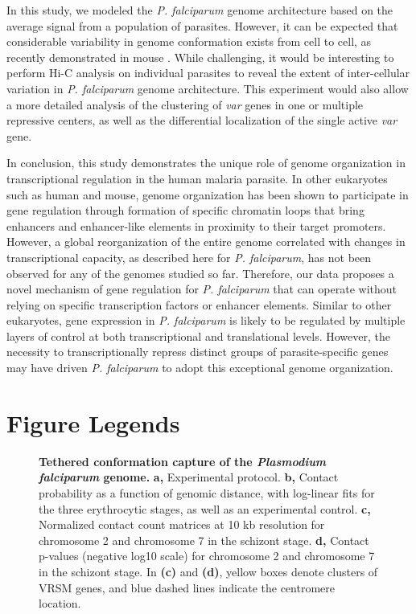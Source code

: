 In this study, we modeled the {\em P. falciparum} genome architecture based on
the average signal from a population of parasites. However, it can be expected
that considerable variability in genome conformation exists from cell to cell,
as recently demonstrated in mouse \citep{nagano:single-cell}. While
challenging, it would be interesting to perform Hi-C analysis on individual
parasites to reveal the extent of inter-cellular variation in {\em P.
falciparum} genome architecture. This experiment would also allow a more
detailed analysis of the clustering of {\em var} genes in one or multiple
repressive centers, as well as the differential localization of the single
active {\em var} gene.

In conclusion, this study demonstrates the unique role of genome organization
in transcriptional regulation in the human malaria parasite. In other
eukaryotes such as human and mouse, genome organization has been shown to
participate in gene regulation through formation of specific chromatin loops
that bring enhancers and enhancer-like elements in proximity to their target
promoters. However, a global reorganization of the entire genome correlated
with changes in transcriptional capacity, as described here for {\em P.
falciparum}, has not been observed for any of the genomes studied so far.
Therefore, our data proposes a novel mechanism of gene regulation for {\em P.
falciparum} that can operate without relying on specific transcription factors
or enhancer elements. Similar to other eukaryotes, gene expression in {\em P.
falciparum} is likely to be regulated by multiple layers of control at both
transcriptional and translational levels. However, the necessity to
transcriptionally repress distinct groups of parasite-specific genes may have
driven {\em P. falciparum} to adopt this exceptional genome organization.

\section*{Figure Legends}

\begin{figure}[h]
\centering
\caption{{\bf Tethered conformation capture of the {\em Plasmodium falciparum}
genome.}
\textbf{a,} Experimental protocol. \textbf{b,} Contact probability as a
function of genomic distance, with log-linear fits for the three erythrocytic
stages, as well as an experimental control. \textbf{c,} Normalized contact
count matrices at 10 kb resolution for chromosome 2 and chromosome 7 in the
schizont stage. \textbf{d,} Contact p-values (negative log10 scale) for
chromosome 2 and chromosome 7 in the schizont stage. In \textbf{(c)} and
\textbf{(d)}, yellow boxes denote clusters of VRSM genes, and blue dashed
lines indicate the centromere location.}
\label{fig:fig1}
\end{figure}

